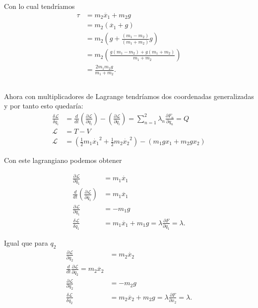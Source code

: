 \documentclass{report}
\begin{document}
Con lo cual tendríamos
\begin{align*}
  \tau &= m_2\ddot{x_1} + m_2g \\
       &= m_2\left( \ddot{x_1} + g \right)  \\
       &= m_2\left( g + \frac{\left( m_1 - m_2 \right) }{\left( m_1 + m_2 \right) }g \right)  \\
       &= m_2\left( \frac{g\left( m_1 - m_2 \right) + g\left( m_1 + m_2 \right) }{m_1 + m_2} \right)  \\
       &= \frac{2m_1m_2 g}{m_1 + m_2}
.\end{align*}

\subsection{}

Ahora con multiplicadores de Lagrange tendríamos dos coordenadas generalizadas y por tanto esto quedaría:
\begin{align*}
  \frac{\delta \mathcal{L}}{\delta q_i} &= \frac{d}{dt}\left( \frac{\partial \mathcal{L}}{\partial \dot{q_i}}  \right) - \left( \frac{\partial \mathcal{L}}{\partial q_i}  \right) = \sum_{n=1}^{2} \lambda_n \frac{\partial F_n}{\partial q_n} = Q \\
  \mathcal{L} &= T - V \\
  \mathcal{L} &= \left( \frac{1}{2}m_1\dot{x_1}^2 + \frac{1}{2}m_2\dot{x_2}^2 \right) - \left( m_1gx_1 + m_2gx_2 \right) 
\end{align*}

Con este lagrangiano podemos obtener

\begin{align*}
  \frac{\partial \mathcal{L}}{\partial \dot{q_1}} &= m_1\dot{x_1}\\
  \frac{d}{dt}\left( \frac{\partial \mathcal{L}}{\partial \dot{q_1}}  \right) &= m_1\ddot{x_1}\\
  \frac{\partial \mathcal{L}}{\partial q_1} &= -m_1g \\
  \frac{\delta \mathcal{L}}{\delta q_1} &= m_1\ddot{x_1} + m_1g = \lambda \frac{\partial F}{\partial q_1} = \lambda
.\end{align*}

Igual que para $q_2$ 
\begin{align*}
  \frac{\partial \mathcal{L}}{\partial \dot{q_2}} &= m_2\dot{x_2} \\
  \frac{d}{dt}\frac{\partial \mathcal{L}}{\partial \dot{q_2}} = m_2\ddot{x_2}\\
  \frac{\partial \mathcal{L}}{\partial q_2} &= -m_2g \\
  \frac{\delta \mathcal{L}}{\delta q_2} &= m_2\ddot{x_2} + m_2g = \lambda \frac{\partial F}{\partial x_2} = \lambda
.\end{align*}
\end{document}
